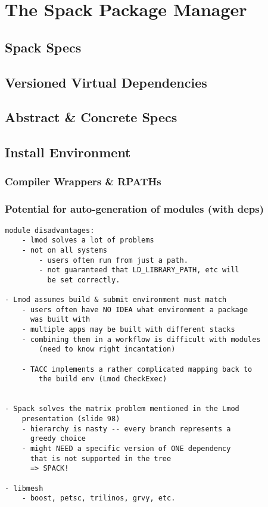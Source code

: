 
\section{The Spack Package Manager}
\label{sec:implementation}



\subsection{Spack Specs}
	
\subsection{Versioned Virtual Dependencies}

\subsection{Abstract \& Concrete Specs}
	
\subsection{Install Environment}

\subsubsection{Compiler Wrappers \& RPATHs}

\subsubsection{Potential for auto-generation of modules (with deps)}

\begin{verbatim}
module disadvantages:
	- lmod solves a lot of problems
	- not on all systems
		- users often run from just a path.
		- not guaranteed that LD_LIBRARY_PATH, etc will
		  be set correctly.

- Lmod assumes build & submit environment must match
	- users often have NO IDEA what environment a package
	  was built with
	- multiple apps may be built with different stacks
	- combining them in a workflow is difficult with modules
		(need to know right incantation)

	- TACC implements a rather complicated mapping back to
	    the build env (Lmod CheckExec)
	

- Spack solves the matrix problem mentioned in the Lmod
    presentation (slide 98)
	- hierarchy is nasty -- every branch represents a
	  greedy choice
	- might NEED a specific version of ONE dependency
	  that is not supported in the tree
	  => SPACK!

- libmesh
	- boost, petsc, trilinos, grvy, etc.
\end{verbatim}
